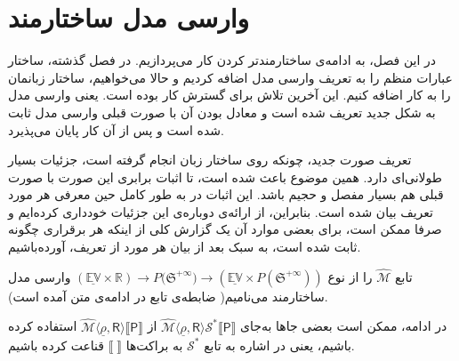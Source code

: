 \chapter{وارسی مدل ساختارمند}

در این فصل، به ادامه‌ی ساختارمندتر کردن کار می‌پردازیم. در فصل گذشته، ساختار عبارات منظم را به تعریف وارسی مدل اضافه کردیم و حالا می‌خواهیم، ساختار زبانمان را به کار اضافه کنیم. این آخرین تلاش \cite{calcul} برای گسترش کار بوده است. یعنی وارسی مدل به شکل جدید تعریف شده است و معادل بودن آن با صورت قبلی وارسی مدل ثابت شده است و پس از آن کار پایان می‌پذیرد. 

تعریف صورت جدید، چونکه روی ساختار زبان انجام گرفته است، جزئیات بسیار طولانی‌ای دارد. همین موضوع باعث شده است، تا اثبات‌ برابری این صورت با صورت قبلی هم بسیار مفصل و حجیم باشد. این اثبات در \cite{calcul} به طور کامل حین معرفی هر مورد تعریف بیان شده است. بنابراین، از ارائه‌ی دوباره‌ی این جزئیات خودداری کرده‌ایم و صرفا ممکن است، برای بعضی موارد آن یک گزارش کلی از اینکه هر برقراری چگونه ثابت شده است، به سبک \cite{calcul} بعد از بیان هر مورد از تعریف، آورده‌باشیم.

\begin{defn}
	
تابع
$\mathcal{\hat{M}}$
 را از نوع
 $\mathbb{(\underline{EV} \times R)} \rightarrow  \mathit{P}({\mathfrak{S}^{+\infty})}
\rightarrow ( \mathbb{\underline{EV}} \times \mathit{P}(\mathfrak{S}^{+\infty})) $
وارسی مدل ساختارمند می‌نامیم( ضابطه‌ی تابع در ادامه‌ی متن آمده است).
\end{defn}
در ادامه، ممکن است بعضی جاها به‌جای 
$\mathcal{\hat{M}}\langle \underline{\rho}, \mathsf{R} \rangle \mathcal{S}^* \llbracket \mathsf{P} \rrbracket$
از 
$\mathcal{\hat{M}}\langle \underline{\rho}, \mathsf{R} \rangle \llbracket \mathsf{P} \rrbracket$
استفاده کرده باشیم، یعنی در اشاره به تابع $\mathcal{S}^*$ به براکت‌ها
$\llbracket \; \rrbracket$
قناعت کرده باشیم.


